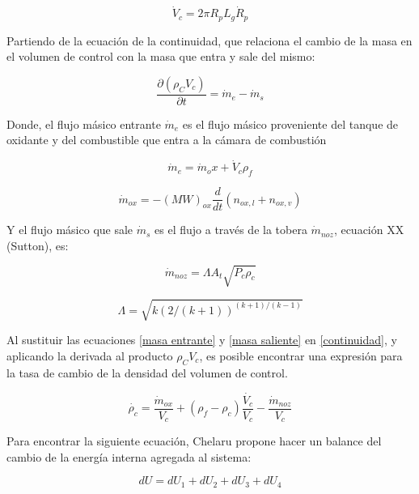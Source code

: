 \documentclass[12pt]{article}
\begin{document}
\begin{equation}
  \dot{V}_{c} = 2 \pi R_{p} L_{g} \dot{R}_{p}
  \label{vol dot}
\end{equation}

Partiendo de la ecuación de la continuidad, que relaciona el cambio de la masa en el volumen de control con la masa que entra y sale del mismo:

\begin{equation}
  \frac{\partial (\rho_C V_{c})}{\partial t} = \dot{m}_e - \dot{m}_s
  \label{continuidad}
\end{equation}

Donde, el flujo másico entrante $\dot{m}_{e}$ es el flujo másico proveniente del tanque de oxidante y del combustible que entra a la cámara de combustión

\begin{equation}
  \dot{m}_{e} = \dot{m}_ox + \dot{V}_{c} \rho_f
  \label{masa entrante}
\end{equation}

\begin{equation}
  \dot{m}_{ox} = - (MW)_{ox} \frac{d}{dt}(n_{ox,l}+n_{ox,v})
\end{equation}

Y el flujo másico que sale $\dot{m}_{s}$ es el flujo a través de la tobera $\dot{m}_{noz}$, ecuación XX (Sutton), es:

\begin{equation}
  \dot{m}_{noz} = \Lambda A_{t} \sqrt{P_{c} \rho_{c}}
  \label{masa saliente}
\end{equation}

\begin{equation}
  \Lambda = \sqrt{k(2 /(k+1))^{(k+1) /(k-1)}}
\end{equation}

Al sustituir las ecuaciones \ref{masa entrante} y \ref{masa saliente} en \ref{continuidad}, y aplicando la derivada al producto $\rho_C V_{c}$, es posible encontrar una expresión para la tasa de cambio de la densidad del volumen de control.

\begin{equation}
  \dot{\rho_{c}}=\frac{\dot{m}_{ox}}{V_{c}}+\left(\rho_{f}-\rho_{c}\right) \frac{\dot{V_{c}}}{V_{c}}-\frac{\dot{m}_{noz}}{V_{c}}
\end{equation}

Para encontrar la siguiente ecuación, Chelaru propone hacer un balance del cambio de la energía interna agregada al sistema:

\begin{equation}
  d U=d U_{1}+d U_{2}+d U_{3}+d U_{4}
  \label{energía interna}
\end{equation}
\end{document}
